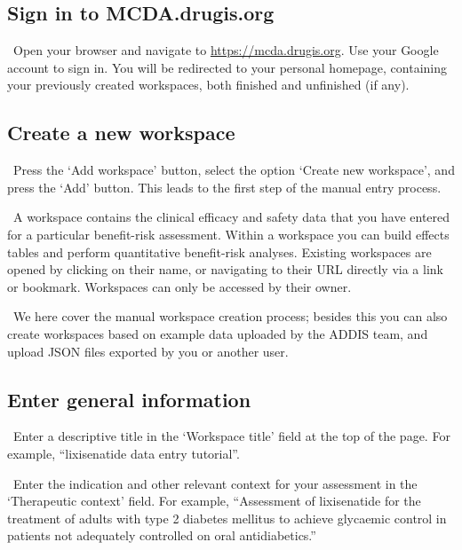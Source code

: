 \documentclass[00_mcda_tutorial.tex]{subfiles}
\begin{document}
\subsection*{Sign in to MCDA.drugis.org}
\leftpointright \, Open your browser and navigate to \href{https://mcda.drugis.org}{https://mcda.drugis.org}. Use your Google account to sign in. You will be redirected to your personal homepage, containing your previously created workspaces, both finished and unfinished (if any).

\subsection*{Create a new workspace}
\leftpointright \, Press the ‘Add workspace’ button, select the option ‘Create new workspace’, and press the ‘Add’ button. This leads to the first step of the manual entry process.
\newline

\noindent \faGraduationCap \, A workspace contains the clinical efficacy and safety data that you have entered for a particular benefit-risk assessment. Within a workspace you can build effects tables and perform quantitative benefit-risk analyses. Existing workspaces are opened by clicking on their name, or navigating to their URL directly via a link or bookmark. Workspaces can only be accessed by their owner.
\newline

\noindent \faLightbulbO \, We here cover the manual workspace creation process; besides this you can also create workspaces based on example data uploaded by the ADDIS team, and upload JSON files exported by you or another user.

\subsection*{Enter general information}
\noindent \leftpointright \, Enter a descriptive title in the ‘Workspace title’ field at the top of the page. For example, “lixisenatide data entry tutorial”. 
\newline

\noindent \leftpointright \, Enter the indication and other relevant context for your assessment in the ‘Therapeutic context’ field. For example, “Assessment of lixisenatide for the treatment of adults with type 2 diabetes mellitus to achieve glycaemic control in patients not adequately controlled on oral antidiabetics.”
\newline
\end{document}
